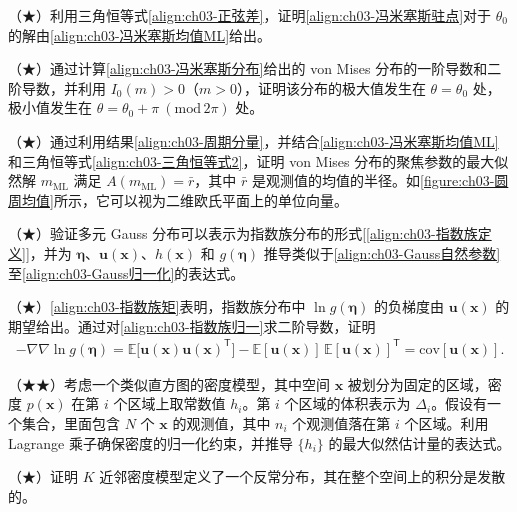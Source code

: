 \documentclass[../../main.tex]{subfiles}
\begin{document}
\begin{exercise}\label{exercise:ch03-32}
（★）利用三角恒等式\eqref{align:ch03-正弦差}，证明\eqref{align:ch03-冯米塞斯驻点}对于 $\theta_0$ 的解由\eqref{align:ch03-冯米塞斯均值ML}给出。
\end{exercise}

\begin{exercise}\label{exercise:ch03-33}
（★）通过计算\eqref{align:ch03-冯米塞斯分布}给出的 von Mises 分布的一阶导数和二阶导数，并利用 $I_0(m)>0$（$m>0$），证明该分布的极大值发生在 $\theta=\theta_0$ 处，极小值发生在 $\theta=\theta_0+\pi\ (\mathrm{mod}\,2\pi)$ 处。
\end{exercise}

\begin{exercise}\label{exercise:ch03-34}
（★）通过利用结果\eqref{align:ch03-周期分量}，并结合\eqref{align:ch03-冯米塞斯均值ML}和三角恒等式\eqref{align:ch03-三角恒等式2}，证明 von Mises 分布的聚焦参数的最大似然解 $m_{\mathrm{ML}}$ 满足 $A(m_{\mathrm{ML}})=\bar{r}$，其中 $\bar{r}$ 是观测值的均值的半径。如\cref{figure:ch03-圆周均值}所示，它可以视为二维欧氏平面上的单位向量。
\end{exercise}

\begin{exercise}\label{exercise:ch03-35}
（★）验证多元 Gauss 分布可以表示为指数族分布的形式[\eqref{align:ch03-指数族定义}]，并为 $\boldsymbol{\eta}$、$\boldsymbol{u}(\boldsymbol{x})$、$h(\boldsymbol{x})$ 和 $g(\boldsymbol{\eta})$ 推导类似于\eqref{align:ch03-Gauss自然参数}至\eqref{align:ch03-Gauss归一化}的表达式。
\end{exercise}

\begin{exercise}\label{exercise:ch03-36}
（★）\eqref{align:ch03-指数族矩}表明，指数族分布中 $\ln g(\boldsymbol{\eta})$ 的负梯度由 $\boldsymbol{u}(\boldsymbol{x})$ 的期望给出。通过对\eqref{align:ch03-指数族归一}求二阶导数，证明
\begin{align*}
-\nabla\nabla\ln g(\boldsymbol{\eta})=\mathbb{E}\bigl[\boldsymbol{u}(\boldsymbol{x})\boldsymbol{u}(\boldsymbol{x})^{\mathsf{T}}\bigr]-\mathbb{E}[\boldsymbol{u}(\boldsymbol{x})]\,\mathbb{E}[\boldsymbol{u}(\boldsymbol{x})]^{\mathsf{T}}=\mathrm{cov}[\boldsymbol{u}(\boldsymbol{x})].
\end{align*}
\end{exercise}

\begin{exercise}\label{exercise:ch03-37}
（★★）考虑一个类似直方图的密度模型，其中空间 $\boldsymbol{x}$ 被划分为固定的区域，密度 $p(\boldsymbol{x})$ 在第 $i$ 个区域上取常数值 $h_i$。第 $i$ 个区域的体积表示为 $\Delta_i$。假设有一个集合，里面包含 $N$ 个 $\boldsymbol{x}$ 的观测值，其中 $n_i$ 个观测值落在第 $i$ 个区域。利用 Lagrange 乘子确保密度的归一化约束，并推导 $\{h_i\}$ 的最大似然估计量的表达式。
\end{exercise}

\begin{exercise}\label{exercise:ch03-38}
（★）证明 $K$ 近邻密度模型定义了一个反常分布，其在整个空间上的积分是发散的。
\end{exercise}
\end{document}
